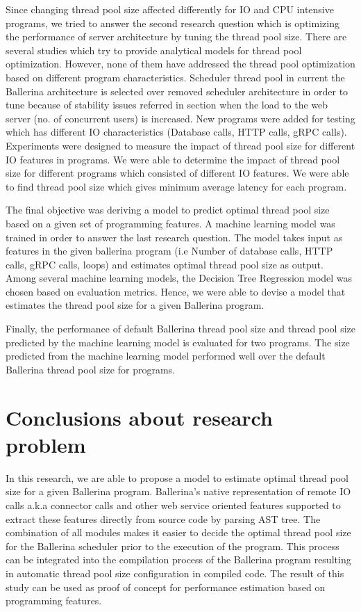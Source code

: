 Since changing thread pool size affected differently for IO and CPU intensive programs, we tried to answer the second research question which is optimizing the performance of server architecture by tuning the thread pool size. There are several studies \cite{xu2004performance,thread_pool_analysis,math_aproach_thread_pool_tuning,syer2011identifying,linfeng2017design} which try to provide analytical models for thread pool optimization. However, none of them have addressed the thread pool optimization based on different program characteristics. Scheduler thread pool in current the Ballerina architecture is selected over removed scheduler architecture in order to tune because of stability issues referred in section when the load to the web server (no. of concurrent users) is increased. New programs were added for testing which has different IO characteristics (Database calls, HTTP calls, gRPC calls). Experiments were designed to measure the impact of thread pool size for different IO features in programs. We were able to determine the impact of thread pool size for different programs which consisted of different IO features. We were able to find thread pool size which gives minimum average latency for each program.


The final objective was deriving a model to predict optimal thread pool size based on a given set of programming features. A machine learning model was trained in order to answer the last research question. The model takes input as features in the given ballerina program (i.e Number of database calls, HTTP calls, gRPC calls, loops) and estimates optimal thread pool size as output. Among several machine learning models, the Decision Tree Regression model was chosen based on evaluation metrics. Hence, we were able to devise a model that estimates the thread pool size for a given Ballerina program.

Finally, the performance of default Ballerina thread pool size and thread pool size predicted by the machine learning model is evaluated for two programs. The size predicted from the machine learning model performed well over the default Ballerina thread pool size for programs. 


\section{Conclusions about research problem}

In this research, we are able to propose a model to estimate optimal thread pool size for a given Ballerina program. Ballerina's native representation of remote IO calls a.k.a connector calls and other web service oriented features supported to extract these features directly from source code by parsing AST tree. The combination of all modules makes it easier to decide the optimal thread pool size for the Ballerina scheduler prior to the execution of the program. This process can be integrated into the compilation process of the Ballerina program resulting in automatic thread pool size configuration in compiled code. The result of this study can be used as proof of concept for performance estimation based on programming features.

